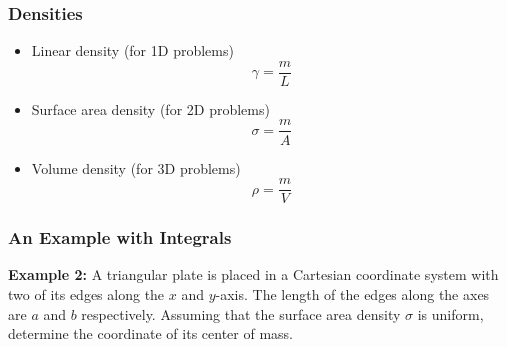 \documentclass[12pt,compress,aspectratio=169]{beamer}
\begin{document}
\begin{frame}
  \frametitle{Densities}
  \begin{itemize}
  \item Linear density (for 1D problems)
    {\Large
      \begin{displaymath}
        \gamma=\frac{m}{L}
      \end{displaymath}
    }
  \item Surface area density (for 2D problems)
    {\Large
      \begin{displaymath}
        \sigma=\frac{m}{A}
      \end{displaymath}
    }
  \item Volume density (for 3D problems)
    {\Large
      \begin{displaymath}
        \rho=\frac{m}{V}
      \end{displaymath}
    }
  \end{itemize}
\end{frame}


\begin{frame}
  \frametitle{An Example with Integrals}
  \begin{minipage}{0.59\textwidth}
    \textbf{Example 2:} A triangular plate is placed in a Cartesian coordinate
    system with two of its edges along the $x$ and $y$-axis. The length of the
    edges along the axes are $a$ and $b$ respectively. Assuming that the
    surface area density $\sigma$ is uniform, determine the coordinate of its
    center of mass.
  \end{minipage}
  \begin{minipage}{0.4\textwidth}
    \begin{center}
    \end{center}
  \end{minipage}
\end{frame}
\end{document}
